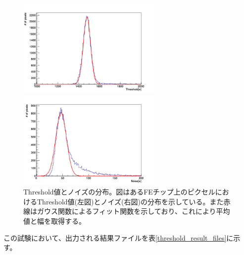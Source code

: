 \begin{figure}[bpt]\centering
  \begin{minipage}{0.45\hsize}
    \includegraphics[width=7cm]{./data/analysis_result/Threshold_mean_dist.png}
  \end{minipage}
  \begin{minipage}{0.45\hsize}
    \includegraphics[width=7cm]{./data/analysis_result/Threshold_noise_dist.png}
  \end{minipage}
  \caption[Threshold値とノイズの分布。]{Threshold値とノイズの分布。図はあるFEチップ上のピクセルにおけるThreshold値(左図)とノイズ(右図)の分布を示している。また赤線はガウス関数によるフィット関数を示しており、これにより平均値と幅を取得する。}
  \label{threshold_mean_sigma}
\end{figure}

この試験において、出力される結果ファイルを表\ref{threshold_result_files}に示す。

